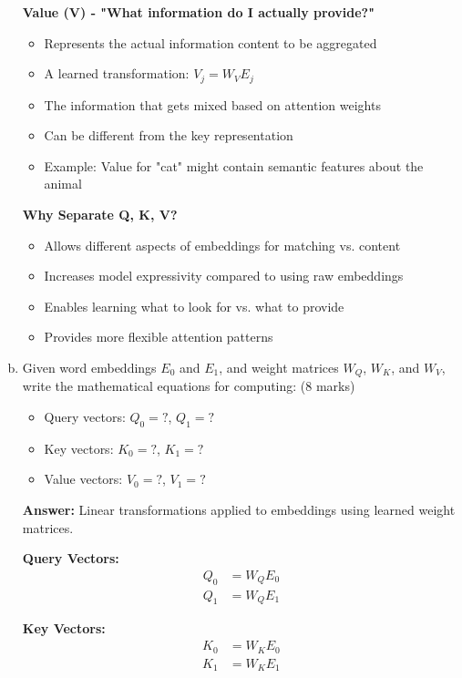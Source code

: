 \documentclass[12pt]{article}
\newcommand{\answer}[1]{{\color{answercolor}\textbf{Answer:} #1}}
\newcommand{\explanation}[1]{{\color{explanationcolor}#1}}
\begin{document}
\begin{enumerate}[(a)]
{    \textbf{Value (V) - "What information do I actually provide?"}
    \begin{itemize}
        \item Represents the actual information content to be aggregated
        \item A learned transformation: $V_j = W_V E_j$
        \item The information that gets mixed based on attention weights
        \item Can be different from the key representation
        \item Example: Value for "cat" might contain semantic features about the animal
    \end{itemize}
    
    \textbf{Why Separate Q, K, V?}
    \begin{itemize}
        \item Allows different aspects of embeddings for matching vs. content
        \item Increases model expressivity compared to using raw embeddings
        \item Enables learning what to look for vs. what to provide
        \item Provides more flexible attention patterns
    \end{itemize}
    }
    
    \item Given word embeddings $E_0$ and $E_1$, and weight matrices $W_Q$, $W_K$, and $W_V$, write the mathematical equations for computing: \hfill (8 marks)
    \begin{itemize}
        \item Query vectors: $Q_0 = ?$, $Q_1 = ?$
        \item Key vectors: $K_0 = ?$, $K_1 = ?$  
        \item Value vectors: $V_0 = ?$, $V_1 = ?$
    \end{itemize}
    
    \answer{Linear transformations applied to embeddings using learned weight matrices.}
    
    \explanation{
    \textbf{Query Vectors:}
    \begin{align}
        Q_0 &= W_Q E_0 \\
        Q_1 &= W_Q E_1
    \end{align}
    
    \textbf{Key Vectors:}
    \begin{align}
        K_0 &= W_K E_0 \\
        K_1 &= W_K E_1
    \end{align}
    
}
\end{enumerate}
\end{document}
